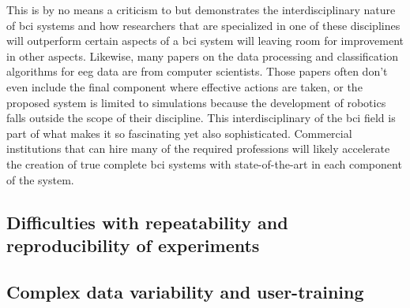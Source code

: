 This is by no means a criticism to \citet{complex_hand_few_classes} but demonstrates the interdisciplinary nature of \gls{bci} systems and how researchers that are specialized in one of these disciplines will outperform certain aspects of a \gls{bci} system will leaving room for improvement in other aspects.
Likewise, many papers on the data processing and classification algorithms for \gls{eeg} data are from computer scientists.
Those papers often don't even include the final component where effective actions are taken, or the proposed system is limited to simulations because the development of robotics falls outside the scope of their discipline.
This interdisciplinary of the \gls{bci} field is part of what makes it so fascinating yet also sophisticated.
Commercial institutions that can hire many of the required professions will likely accelerate the creation of true complete \gls{bci} systems with state-of-the-art in each component of the system.


\subsection{Difficulties with repeatability and reproducibility of experiments}
\label{subsec:bci_opportunities_obstacles_repeatability_reproducibility}


\lipsum[1-2]


\subsection{Complex data variability and user-training}
\label{subsec:bci_opportunities_obstacles_training_and_variability}


